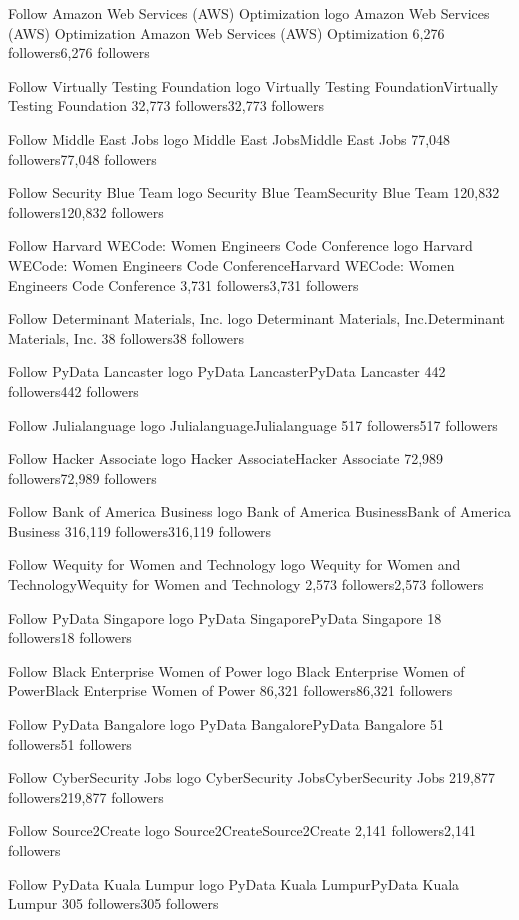 Follow
Amazon Web Services (AWS) Optimization  logo
Amazon Web Services (AWS) Optimization Amazon Web Services (AWS) Optimization 
6,276 followers6,276 followers

Follow
Virtually Testing Foundation logo
Virtually Testing FoundationVirtually Testing Foundation
32,773 followers32,773 followers

Follow
Middle East Jobs logo
Middle East JobsMiddle East Jobs
77,048 followers77,048 followers

Follow
Security Blue Team logo
Security Blue TeamSecurity Blue Team
120,832 followers120,832 followers

Follow
Harvard WECode: Women Engineers Code Conference logo
Harvard WECode: Women Engineers Code ConferenceHarvard WECode: Women Engineers Code Conference
3,731 followers3,731 followers

Follow
Determinant Materials, Inc. logo
Determinant Materials, Inc.Determinant Materials, Inc.
38 followers38 followers

Follow
PyData Lancaster logo
PyData LancasterPyData Lancaster
442 followers442 followers

Follow
Julialanguage logo
JulialanguageJulialanguage
517 followers517 followers

Follow
Hacker Associate logo
Hacker AssociateHacker Associate
72,989 followers72,989 followers

Follow
Bank of America Business logo
Bank of America BusinessBank of America Business
316,119 followers316,119 followers

Follow
Wequity for Women and Technology logo
Wequity for Women and TechnologyWequity for Women and Technology
2,573 followers2,573 followers

Follow
PyData Singapore logo
PyData SingaporePyData Singapore
18 followers18 followers

Follow
Black Enterprise Women of Power logo
Black Enterprise Women of PowerBlack Enterprise Women of Power
86,321 followers86,321 followers

Follow
PyData Bangalore logo
PyData BangalorePyData Bangalore
51 followers51 followers

Follow
CyberSecurity Jobs logo
CyberSecurity JobsCyberSecurity Jobs
219,877 followers219,877 followers

Follow
Source2Create logo
Source2CreateSource2Create
2,141 followers2,141 followers

Follow
PyData Kuala Lumpur logo
PyData Kuala LumpurPyData Kuala Lumpur
305 followers305 followers

